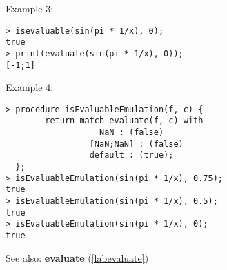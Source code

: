 \noindent Example 3: 
\begin{center}\begin{minipage}{15cm}\begin{Verbatim}[frame=single]
> isevaluable(sin(pi * 1/x), 0);
true
> print(evaluate(sin(pi * 1/x), 0));
[-1;1]
\end{Verbatim}
\end{minipage}\end{center}
\noindent Example 4: 
\begin{center}\begin{minipage}{15cm}\begin{Verbatim}[frame=single]
> procedure isEvaluableEmulation(f, c) {
        return match evaluate(f, c) with 
                   NaN : (false)
                 [NaN;NaN] : (false)
                 default : (true);
  };
> isEvaluableEmulation(sin(pi * 1/x), 0.75);
true
> isEvaluableEmulation(sin(pi * 1/x), 0.5);
true
> isEvaluableEmulation(sin(pi * 1/x), 0);
true
\end{Verbatim}
\end{minipage}\end{center}
See also: \textbf{evaluate} (\ref{labevaluate})
